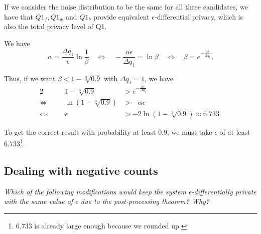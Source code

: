 \documentclass[parskip=half]{scrartcl}
\begin{document}
\begin{enumerate}
    If we consider the noise distribution to be the same for all three
    candidates, we have that $Q1_f, Q1_w$ and $Q1_b$ provide equivalent
    $\epsilon$-differential privacy, which is also the total privacy level of
    Q1.

    We have
    $$
        \alpha = \frac{\Delta q_1}{\epsilon}\ln{\frac{1}{\beta}}
        \quad\Leftrightarrow\quad
        -\frac{\alpha\epsilon}{\Delta q_1} = \ln{\beta}
        \quad\Leftrightarrow\quad
        \beta = e^{-\frac{\alpha\epsilon}{\Delta q_1}}.
    $$
    
    Thus, if we want $\beta < 1 - \sqrt[3]{0.9}$ with $\Delta q_1 = 1$, we have
    \begin{alignat*}{2}
        \quad &&
            1 - \sqrt[3]{0.9} &> e^{-\frac{\alpha\epsilon}{\Delta q_1}}\\
        \Leftrightarrow\quad &&
            \ln{\left(1 - \sqrt[3]{0.9}\right)} &> -\alpha\epsilon\\
        \Leftrightarrow\quad &&
            \epsilon &> -2 \ln{\left(1 - \sqrt[3]{0.9}\right)} \approx 6.733.
    \end{alignat*}

    To get the correct result with probability at least $0.9$, we must take
    $\epsilon$ of at least $6.733$\footnote{$6.733$ is already large enough
    because we rounded up.}.
\end{enumerate}

\subsection{Dealing with negative counts}

\textit{Which of the following modifications would keep the system
$\epsilon$-differentially private with the same value of $\epsilon$ due to the
post-processing theorem? Why?}
\end{document}
